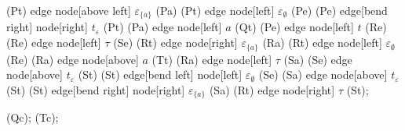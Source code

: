 \begin{isabellebody}
\begin{isamarkuptext}
{{{{    \path   (Pt)    edge node[above left]           {$\varepsilon_{\{a\}}$}     (Pa)
            (Pt)    edge node[left]                 {$\varepsilon_\emptyset$}   (Pe)
            (Pe)    edge[bend right] node[right]    {$t_\varepsilon$}           (Pt)
            (Pa)    edge node[left]                 {$a$}                       (Qt)
            (Pe)    edge node[left]                 {$t$}                       (Re)
            (Re)    edge node[left]                 {$\tau$}                    (Se)
            (Rt)    edge node[right]                {$\varepsilon_{\{a\}}$}     (Ra)
            (Rt)    edge node[left]                 {$\varepsilon_\emptyset$}   (Re)
            (Ra)    edge node[above]                {$a$}                       (Tt)
            (Ra)    edge node[left]                 {$\tau$}                    (Sa)
            (Se)    edge node[above]                {$t_\varepsilon$}           (St)
            (St)    edge[bend left] node[left]      {$\varepsilon_\emptyset$}   (Se)
            (Sa)    edge node[above]                {$t_\varepsilon$}           (St)
            (St)    edge[bend right] node[right]    {$\varepsilon_{\{a\}}$}   (Sa)
            (Rt)    edge node[right]                {$\tau$}                    (St);
            
    \coordinate [below of=Qt,yshift=10pt] (Qc);
    \coordinate [below of=Tt,yshift=10pt] (Tc);
            
}}}}
\end{isamarkuptext}
\end{isabellebody}
